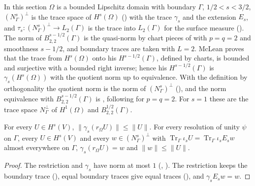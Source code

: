 In this section $\Omega$ is a bounded Lipschitz domain with boundary $\Gamma$, $1/2 < s < 3/2$,
$(N^s_\Gamma)^\perp$ is the trace space of $H^s(\Omega)$ () with the trace
$\gamma_s$ and the extension $E_s$, and $\tau_s : (N^s_\Gamma)^\perp \to L_2(\Gamma)$ is the
trace into $L_2(\Gamma)$ for the surface measure (). The norm of
$B^{s-1/2}_{2,2}(\Gamma)$ is the quasi-norm by chart pieces of 
with $p = q = 2$ and smoothness $s - 1/2$, and boundary traces are taken with $L = 2$. McLean
\cite[Theorem 3.38]{McLean} proves that the trace from $H^s(\Omega)$ onto his
$H^{s-1/2}(\Gamma)$, defined by charts, is bounded and surjective with a bounded right inverse;
hence his $H^{s-1/2}(\Gamma)$ is $\gamma_s(H^s(\Omega))$ with the quotient norm up to
equivalence. With the definition by orthogonality the quotient norm is the norm of
$(N^s_\Gamma)^\perp$ (), and the norm equivalence with
$B^{s-1/2}_{2,2}(\Gamma)$ is , following
\cite[Theorem 4.11]{SchneiderVybiral} for $p = q = 2$. For $s = 1$ these are the trace space
$N_\Gamma^\perp$ of $H^1(\Omega)$ and $B^{1/2}_{2,2}(\Gamma)$.

\begin{lemma}
\label{lem:boundary-trace-restriction}
\leanok
{}
For every $U \in H^s(V)$, $\|\gamma_s(r_\Omega U)\| \leq \|U\|$. For every resolution of unity
$\psi$ on $\Gamma$, every $U \in H^s(V)$ and every $w \in (N^s_\Gamma)^\perp$ with
$\operatorname{Tr}_\Gamma \iota_s U = \operatorname{Tr}_\Gamma \iota_s E_s w$ almost everywhere
on $\Gamma$, $\gamma_s(r_\Omega U) = w$ and $\|w\| \leq \|U\|$.
\end{lemma}

\begin{proof}
\leanok
The restriction and $\gamma_s$ have norm at most $1$ (,
). The restriction keeps the boundary trace
(), equal boundary traces give equal traces
(), and $\gamma_s E_s w = w$.
\end{proof}

